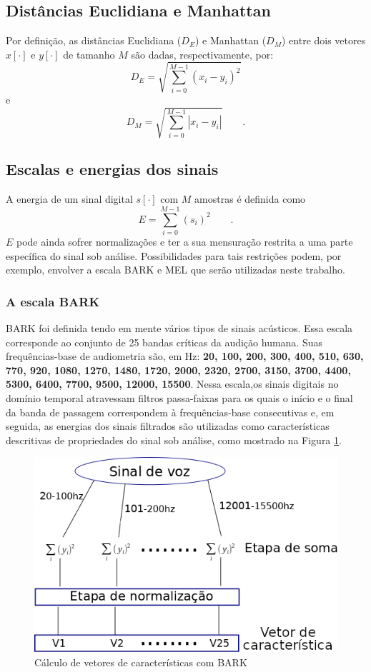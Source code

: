 \subsection{Distâncias Euclidiana e Manhattan}
    \par Por definição, as distâncias Euclidiana ($D_E$) e Manhattan ($D_M$) entre dois vetores $x[\cdot]$ e $y[\cdot]$ de tamanho $M$ são dadas, respectivamente, por:
    \begin{equation}
     D_E = \sqrt{\sum\limits_{i=0}^{M-1}(x_i - y_i)^2}
    \end{equation}
	e
    \begin{equation}
        D_M = \sqrt{\sum\limits_{i=0}^{M-1}|x_i - y_i|}   
        \qquad. 
    \end{equation}

\subsection{Escalas e energias dos sinais}
	\par A energia de um sinal digital $s[\cdot]$ com $M$ amostras é definida como
	\begin{equation}
	E = \sum\limits_{i=0}^{M-1}(s_i)^2 \qquad.   
	\end{equation}
	$E$ pode ainda sofrer normalizações e ter a sua mensuração restrita a uma parte específica do sinal sob análise. Possibilidades para tais restrições podem, por exemplo, envolver a escala BARK \cite{doi:10.1121-1.1908630} e MEL \cite{beranek1949acoustic} que serão utilizadas neste trabalho.
	\subsubsection{A escala BARK}
		\par BARK foi definida tendo em mente vários tipos de sinais acústicos. Essa escala corresponde ao conjunto de 25 bandas críticas da audição humana. Suas frequências-base de audiometria são, em Hz: \textbf{20, 100, 200, 300, 400, 510, 630, 770, 920, 1080, 1270, 1480, 1720, 2000, 2320, 2700, 3150, 3700, 4400, 5300, 6400, 7700, 9500, 12000, 15500}. Nessa escala,os sinais digitais no domínio temporal atravessam filtros passa-faixas \cite{bosi2002introduction} para os quais o início e o final da banda de passagem correspondem à frequências-base consecutivas e, em seguida, as energias dos sinais filtrados são utilizadas como características descritivas de propriedades do sinal sob análise, como mostrado na Figura \ref{fig:barkfeaturevect}.
		\begin{figure}[h]
			\centering
			\includegraphics[width=0.6\linewidth]{images/barkFeatureVect}
			\caption{Cálculo de vetores de características com BARK}
			\label{fig:barkfeaturevect}
		\end{figure}

